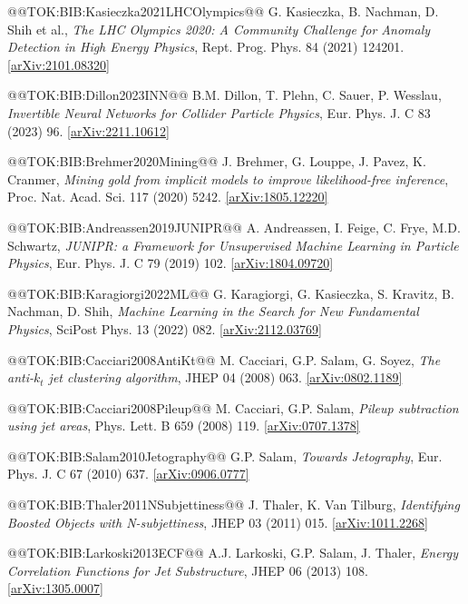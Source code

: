 \documentclass{article}
\begin{document}
@@TOK:BIB:Kasieczka2021LHCOlympics@@ G. Kasieczka, B. Nachman, D. Shih et al.,
\emph{The LHC Olympics 2020: A Community Challenge for Anomaly Detection in High Energy Physics},
Rept. Prog. Phys. 84 (2021) 124201. \href{https://arxiv.org/abs/2101.08320}{[arXiv:2101.08320]}

@@TOK:BIB:Dillon2023INN@@ B.M. Dillon, T. Plehn, C. Sauer, P. Wesslau,
\emph{Invertible Neural Networks for Collider Particle Physics},
Eur. Phys. J. C 83 (2023) 96. \href{https://arxiv.org/abs/2211.10612}{[arXiv:2211.10612]}

@@TOK:BIB:Brehmer2020Mining@@ J. Brehmer, G. Louppe, J. Pavez, K. Cranmer,
\emph{Mining gold from implicit models to improve likelihood-free inference},
Proc. Nat. Acad. Sci. 117 (2020) 5242. \href{https://arxiv.org/abs/1805.12220}{[arXiv:1805.12220]}

@@TOK:BIB:Andreassen2019JUNIPR@@ A. Andreassen, I. Feige, C. Frye, M.D. Schwartz,
\emph{JUNIPR: a Framework for Unsupervised Machine Learning in Particle Physics},
Eur. Phys. J. C 79 (2019) 102. \href{https://arxiv.org/abs/1804.09720}{[arXiv:1804.09720]}

@@TOK:BIB:Karagiorgi2022ML@@ G. Karagiorgi, G. Kasieczka, S. Kravitz, B. Nachman, D. Shih,
\emph{Machine Learning in the Search for New Fundamental Physics},
SciPost Phys. 13 (2022) 082. \href{https://arxiv.org/abs/2112.03769}{[arXiv:2112.03769]}

@@TOK:BIB:Cacciari2008AntiKt@@ M. Cacciari, G.P. Salam, G. Soyez,
\emph{The anti-$k_t$ jet clustering algorithm},
JHEP 04 (2008) 063. \href{https://arxiv.org/abs/0802.1189}{[arXiv:0802.1189]}

@@TOK:BIB:Cacciari2008Pileup@@ M. Cacciari, G.P. Salam,
\emph{Pileup subtraction using jet areas},
Phys. Lett. B 659 (2008) 119. \href{https://arxiv.org/abs/0707.1378}{[arXiv:0707.1378]}

@@TOK:BIB:Salam2010Jetography@@ G.P. Salam,
\emph{Towards Jetography},
Eur. Phys. J. C 67 (2010) 637. \href{https://arxiv.org/abs/0906.0777}{[arXiv:0906.0777]}

@@TOK:BIB:Thaler2011NSubjettiness@@ J. Thaler, K. Van Tilburg,
\emph{Identifying Boosted Objects with N-subjettiness},
JHEP 03 (2011) 015. \href{https://arxiv.org/abs/1011.2268}{[arXiv:1011.2268]}

@@TOK:BIB:Larkoski2013ECF@@ A.J. Larkoski, G.P. Salam, J. Thaler,
\emph{Energy Correlation Functions for Jet Substructure},
JHEP 06 (2013) 108. \href{https://arxiv.org/abs/1305.0007}{[arXiv:1305.0007]}
\end{document}
